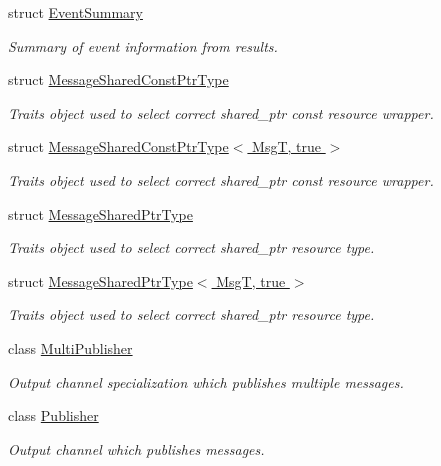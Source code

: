 \begin{DoxyCompactItemize}
struct \hyperlink{structflow__ros_1_1_event_summary}{Event\+Summary}
\begin{DoxyCompactList}\small\item\em Summary of event information from results. \end{DoxyCompactList}\item 
struct \hyperlink{structflow__ros_1_1_message_shared_const_ptr_type}{Message\+Shared\+Const\+Ptr\+Type}
\begin{DoxyCompactList}\small\item\em Traits object used to select correct shared\+\_\+ptr const resource wrapper. \end{DoxyCompactList}\item 
struct \hyperlink{structflow__ros_1_1_message_shared_const_ptr_type_3_01_msg_t_00_01true_01_4}{Message\+Shared\+Const\+Ptr\+Type$<$ Msg\+T, true $>$}
\begin{DoxyCompactList}\small\item\em Traits object used to select correct shared\+\_\+ptr const resource wrapper. \end{DoxyCompactList}\item 
struct \hyperlink{structflow__ros_1_1_message_shared_ptr_type}{Message\+Shared\+Ptr\+Type}
\begin{DoxyCompactList}\small\item\em Traits object used to select correct shared\+\_\+ptr resource type. \end{DoxyCompactList}\item 
struct \hyperlink{structflow__ros_1_1_message_shared_ptr_type_3_01_msg_t_00_01true_01_4}{Message\+Shared\+Ptr\+Type$<$ Msg\+T, true $>$}
\begin{DoxyCompactList}\small\item\em Traits object used to select correct shared\+\_\+ptr resource type. \end{DoxyCompactList}\item 
class \hyperlink{classflow__ros_1_1_multi_publisher}{Multi\+Publisher}
\begin{DoxyCompactList}\small\item\em Output channel specialization which publishes multiple messages. \end{DoxyCompactList}\item 
class \hyperlink{classflow__ros_1_1_publisher}{Publisher}
\begin{DoxyCompactList}\small\item\em Output channel which publishes messages. \end{DoxyCompactList}\item 

\end{DoxyCompactItemize}
